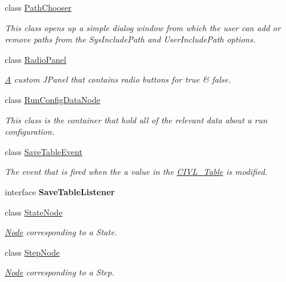 \begin{DoxyCompactItemize}
class \hyperlink{classedu_1_1udel_1_1cis_1_1vsl_1_1civl_1_1gui_1_1common_1_1PathChooser}{Path\+Chooser}
\begin{DoxyCompactList}\small\item\em This class opens up a simple dialog window from which the user can add or remove paths from the Sys\+Include\+Path and User\+Include\+Path options. \end{DoxyCompactList}\item 
class \hyperlink{classedu_1_1udel_1_1cis_1_1vsl_1_1civl_1_1gui_1_1common_1_1RadioPanel}{Radio\+Panel}
\begin{DoxyCompactList}\small\item\em \hyperlink{structA}{A} custom J\+Panel that contains radio buttons for true \& false. \end{DoxyCompactList}\item 
class \hyperlink{classedu_1_1udel_1_1cis_1_1vsl_1_1civl_1_1gui_1_1common_1_1RunConfigDataNode}{Run\+Config\+Data\+Node}
\begin{DoxyCompactList}\small\item\em This class is the container that hold all of the relevant data about a run configuration. \end{DoxyCompactList}\item 
class \hyperlink{classedu_1_1udel_1_1cis_1_1vsl_1_1civl_1_1gui_1_1common_1_1SaveTableEvent}{Save\+Table\+Event}
\begin{DoxyCompactList}\small\item\em The event that is fired when the a value in the \hyperlink{}{C\+I\+V\+L\+\_\+\+Table} is modified. \end{DoxyCompactList}\item 
interface {\bfseries Save\+Table\+Listener}
\item 
class \hyperlink{classedu_1_1udel_1_1cis_1_1vsl_1_1civl_1_1gui_1_1common_1_1StateNode}{State\+Node}
\begin{DoxyCompactList}\small\item\em \hyperlink{structNode}{Node} corresponding to a State. \end{DoxyCompactList}\item 
class \hyperlink{classedu_1_1udel_1_1cis_1_1vsl_1_1civl_1_1gui_1_1common_1_1StepNode}{Step\+Node}
\begin{DoxyCompactList}\small\item\em \hyperlink{structNode}{Node} corresponding to a Step. \end{DoxyCompactList}\item 

\end{DoxyCompactItemize}
